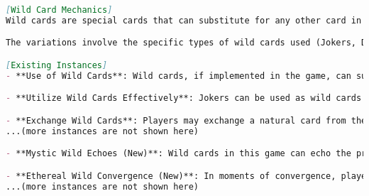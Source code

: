 \begin{tcolorbox}[
breakable,
colframe=lightgray, 
colback=lightgray,
coltitle=black,
left=1mm, %
right=1mm, %
top=0mm, %
bottom=0mm, %
fonttitle=\small,
boxrule=0mm, %
]
\begin{lstlisting}[language=markdown]
[Wild Card Mechanics]
Wild cards are special cards that can substitute for any other card in a hand or meld, offering strategic flexibility.

The variations involve the specific types of wild cards used (Jokers, Deuces) and the specific actions players can take, such as exchanging cards with opponents or enhancing poker hands.

[Existing Instances]
- **Use of Wild Cards**: Wild cards, if implemented in the game, can substitute for any card to form a strong hand.

- **Utilize Wild Cards Effectively**: Jokers can be used as wild cards to complete or enhance poker hands.

- **Exchange Wild Cards**: Players may exchange a natural card from their hand with a 2 or Joker from an opponent's meld.
...(more instances are not shown here)

- **Mystic Wild Echoes (New)**: Wild cards in this game can echo the previous card played, not only mirroring its value but also granting players the added strategic benefit of amplifying any special effects associated with that card.

- **Ethereal Wild Convergence (New)**: In moments of convergence, players can use wild cards to merge two unrelated sequences or hands, forging powerful combinations and unlocking hidden advantages in their decks.
...(more instances are not shown here)
\end{lstlisting}
\end{tcolorbox}